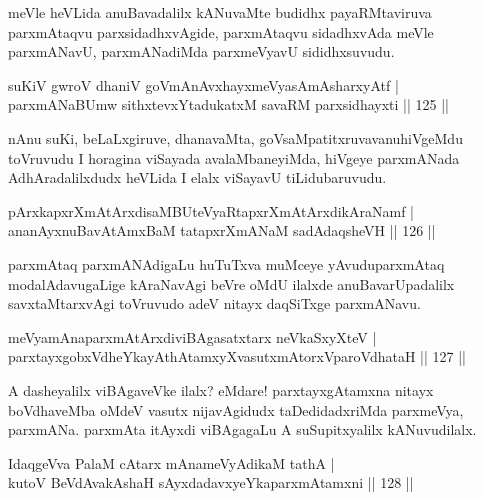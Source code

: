 \begin{artha}
meVle heVLida anuBavadalilx kANuvaMte budidhx payaRMtaviruva parxmAtaqvu parxsidadhxvAgide, parxmAtaqvu sidadhxvAda meVle parxmANavU, parxmANadiMda parxmeVyavU sididhxsuvudu.
\end{artha}


\begin{shl}
suKiV gwroV dhaniV goVmAnAvxhayxmeVyasAmAsharxyAtf |\\
parxmANaBUmw sithxtevxYtadukatxM savaRM parxsidhayxti \hfill || 125 ||
\end{shl}

\begin{artha}
nAnu suKi, beLaLxgiruve, dhanavaMta, goVsaMpatitxruvavanu\break hiVgeMdu toVruvudu I horagina viSayada avalaMbaneyiMda, hiVgeye parxmANada AdhAradalilxdudx heVLida I elalx viSayavU tiLidubaruvudu.
\end{artha}


\begin{shl}
pArxkapxrXmAtArxdisaMBUteVyaRtapxrXmAtArxdikAraNamf |\\
ananAyxnuBavAtAmxBaM tatapxrXmANaM sadAdaqsheVH \hfill || 126 ||
\end{shl}

\begin{artha}
parxmAtaq parxmANAdigaLu huTuTxva muMceye yAvudu\break parxmAtaq modalAdavugaLige kAraNavAgi beVre oMdU ilalxde anuBavarUpadalilx savxtaMtarxvAgi toVruvudo adeV nitayx daqSiTxge parxmANavu.
\end{artha}

\begin{shl}
meVyamAnaparxmAtArxdiviBAgasatxtarx neVkaSxyXteV |\\
parxtayxgobxVdheYkayAthAtamxyXvasutxmAtorxVparoVdhataH \hfill || 127 ||
\end{shl}

\begin{artha}
A dasheyalilx viBAgaveVke ilalx? eMdare! parxtayxgAtamxna nitayx boVdhaveMba oMdeV vasutx nijavAgidudx taDedidadxriMda parxmeVya, parxmANa. parxmAta itAyxdi viBAgagaLu A suSupitxyalilx kANuvudilalx.
\end{artha}

\begin{shl}
IdaqgeVva PalaM cAtarx mAnameVyAdikaM tathA |\\
kutoV BeVdAvakAshaH sAyxdadavxyeYkaparxmAtamxni \hfill || 128 ||
\end{shl}

